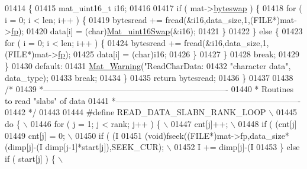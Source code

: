\begin{DoxyCode}
{01414         \{
01415             mat\_uint16\_t i16;
01416 
01417             \textcolor{keywordflow}{if} ( mat->\hyperlink{struct__mat__t_a99d207977af5e04941ace56d71817a40}{byteswap} ) \{
01418                 \textcolor{keywordflow}{for} ( i = 0; i < len; i++ ) \{
01419                     bytesread += fread(&i16,data\_size,1,(FILE*)mat->\hyperlink{struct__mat__t_a85f562e407ca9ad4d2a6e14f839432b7}{fp});
01420                     data[i] = (char)\hyperlink{endian_8c_a0fd527794c69f2872e80a6f20cd09fd2}{Mat\_uint16Swap}(&i16);
01421                 \}
01422             \} \textcolor{keywordflow}{else} \{
01423                 \textcolor{keywordflow}{for} ( i = 0; i < len; i++ ) \{
01424                     bytesread += fread(&i16,data\_size,1,(FILE*)mat->\hyperlink{struct__mat__t_a85f562e407ca9ad4d2a6e14f839432b7}{fp});
01425                     data[i] = (char)i16;
01426                 \}
01427             \}
01428             \textcolor{keywordflow}{break};
01429         \}
01430         \textcolor{keywordflow}{default}:
01431             \hyperlink{group__mat__util_gafcedc83eb7e4759a8ea5c974c4f801c3}{Mat\_Warning}(\textcolor{stringliteral}{"ReadCharData: %
01432                 \textcolor{stringliteral}{"character data"}, data\_type);
01433             \textcolor{keywordflow}{break};
01434     \}
01435     \textcolor{keywordflow}{return} bytesread;
01436 \}
01437 
01438 \textcolor{comment}{/*}
01439 \textcolor{comment}{ *-------------------------------------------------------------------}
01440 \textcolor{comment}{ *  Routines to read "slabs" of data}
01441 \textcolor{comment}{ *-------------------------------------------------------------------}
01442 \textcolor{comment}{ */}
01443 
01444 \textcolor{preprocessor}{#define READ\_DATA\_SLABN\_RANK\_LOOP \(\backslash\)}
01445 \textcolor{preprocessor}{    do \{ \(\backslash\)}
01446 \textcolor{preprocessor}{        for ( j = 1; j < rank; j++ ) \{ \(\backslash\)}
01447 \textcolor{preprocessor}{            cnt[j]++; \(\backslash\)}
01448 \textcolor{preprocessor}{            if ( (cnt[j] %
01449 \textcolor{preprocessor}{                cnt[j] = 0; \(\backslash\)}
01450 \textcolor{preprocessor}{                if ( (I %
01451 \textcolor{preprocessor}{                    (void)fseek((FILE*)mat->fp,data\_size*(dimp[j]-(I %
       dimp[j-1]*start[j]),SEEK\_CUR); \(\backslash\)}
01452 \textcolor{preprocessor}{                    I += dimp[j]-(I %
01453 \textcolor{preprocessor}{                \} else if ( start[j] ) \{ \(\backslash\)}
}}}}}
\end{DoxyCode}
